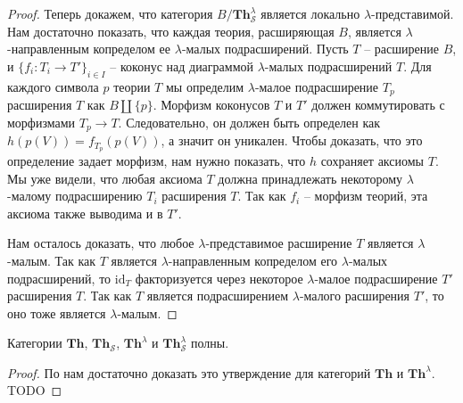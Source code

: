 \documentclass[reqno]{amsart}
\theoremstyle{definition}
\theoremstyle{remark}
\newcommand{\bcat}[1]{\mathbf{#1}}
\newcommand{\fs}[1]{\mathrm{#1}}
\newcommand{\Th}{\bcat{Th}}
\begin{document}
\begin{proof}
Теперь докажем, что категория $B/\Th_\mathcal{S}^\lambda$ является локально $\lambda$-представимой.
Нам достаточно показать, что каждая теория, расширяющая $B$, является $\lambda$-направленным копределом ее $\lambda$-малых подрасширений.
Пусть $T$ -- расширение $B$, и $\{ f_i : T_i \to T' \}_{i \in I}$ -- коконус над диаграммой $\lambda$-малых подрасширений $T$.
Для каждого символа $p$ теории $T$ мы определим $\lambda$-малое подрасширение $T_p$ расширения $T$ как $B \amalg \{ p \}$.
Морфизм коконусов $T$ и $T'$ должен коммутировать с морфизмами $T_p \to T$.
Следовательно, он должен быть определен как $h(p(V)) = f_{T_p}(p(V))$, а значит он уникален.
Чтобы доказать, что это определение задает морфизм, нам нужно показать, что $h$ сохраняет аксиомы $T$.
Мы уже видели, что любая аксиома $T$ должна принадлежать некоторому $\lambda$-малому подрасширению $T_i$ расширения $T$.
Так как $f_i$ -- морфизм теорий, эта аксиома также выводима и в $T'$.

Нам осталось доказать, что любое $\lambda$-представимое расширение $T$ является $\lambda$-малым.
Так как $T$ является $\lambda$-направленным копределом его $\lambda$-малых подрасширений, то $\fs{id}_T$ факторизуется через некоторое $\lambda$-малое подрасширение $T'$ расширения $T$.
Так как $T$ является подрасширением $\lambda$-малого расширения $T'$, то оно тоже является $\lambda$-малым.
\end{proof}

\begin{prop}[th-limits]
Категории $\Th$, $\Th_\mathcal{S}$, $\Th^\lambda$ и $\Th_\mathcal{S}^\lambda$ полны.
\end{prop}
\begin{proof}
По  нам достаточно доказать это утверждение для категорий $\Th$ и $\Th^\lambda$.
TODO
\end{proof}
\end{document}
